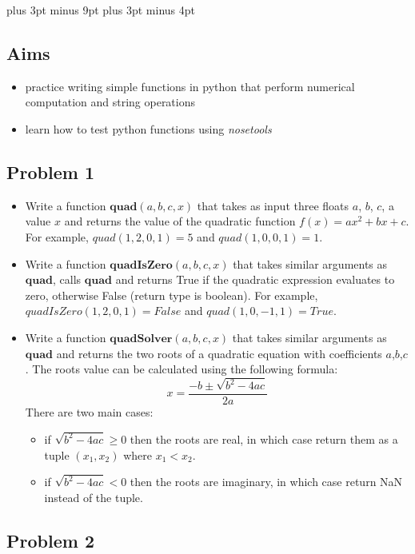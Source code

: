 \documentclass[11pt,a4paper]{report}
\begin{document}
\belowdisplayskip=12pt plus 3pt minus 9pt
\belowdisplayshortskip=7pt plus 3pt minus 4pt

\subsection*{Aims}
\begin{itemize}
 \item practice writing simple functions in python that perform numerical computation and string operations
 \item learn how to test python functions using \emph{nosetools}
\end{itemize}


\subsection*{Problem 1}

\begin{itemize}
 \item Write a function $\textbf{quad}(a, b, c, x)$ that takes as input three floats $a$, $b$, $c$, a value $x$ and returns the value of the quadratic function $f(x) = ax^2 +bx +c$. For example, $quad(1,2,0,1) = 5$ and $quad(1,0,0,1) = 1$. 
 \item Write a function $\textbf{quadIsZero}(a, b, c, x)$ that takes similar arguments as $\textbf{quad}$, calls $\textbf{quad}$ and returns True if the quadratic expression evaluates to zero, otherwise False (return type is boolean). For example, $quadIsZero(1,2,0,1) = False$ and $quad(1,0,-1,1) = True$. 
 \item Write a function $\textbf{quadSolver}(a, b, c, x)$ that takes similar arguments as $\textbf{quad}$ and returns the two roots of a quadratic equation with coefficients $a$,$b$,$c$. The roots value can be calculated using the following formula:
 $$ x = \frac{-b \pm \sqrt{b^2 - 4ac}}{2a}$$
 There are two main cases:
 \begin{itemize}
  \item if $\sqrt{b^2 - 4ac} \ge 0 $ then the roots are real, in which case return them as a tuple $(x_1,x_2)$ where $x_1 < x_2$. 
  \item if $\sqrt{b^2 - 4ac} < 0 $ then the roots are imaginary, in which case return NaN instead of the tuple.
 \end{itemize}
\end{itemize}

\subsection*{Problem 2}
\end{document}

